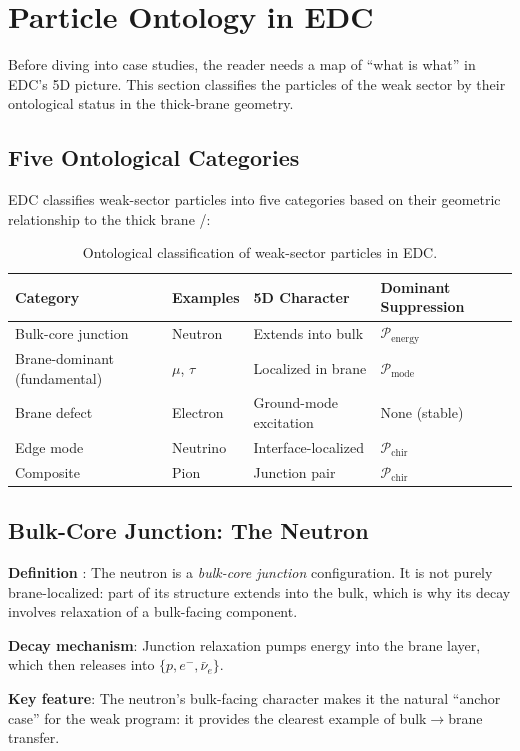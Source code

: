 
\section{Particle Ontology in EDC}
\label{sec:ontology}

Before diving into case studies, the reader needs a map of ``what is what'' in
EDC's 5D picture. This section classifies the particles of the weak sector by
their ontological status in the thick-brane geometry.

\subsection{Five Ontological Categories}

EDC classifies weak-sector particles into five categories based on their
geometric relationship to the thick brane \tagP{}/\tagDc{}:

\begin{table}[ht]
\centering
\begin{tabular}{llll}
\toprule
\textbf{Category} & \textbf{Examples} & \textbf{5D Character} & \textbf{Dominant Suppression} \\
\midrule
Bulk-core junction & Neutron & Extends into bulk & $\mathcal{P}_{\text{energy}}$ \\
Brane-dominant (fundamental) & $\mu$, $\tau$ & Localized in brane & $\mathcal{P}_{\text{mode}}$ \\
Brane defect & Electron & Ground-mode excitation & None (stable) \\
Edge mode & Neutrino & Interface-localized & $\mathcal{P}_{\text{chir}}$ \\
Composite & Pion & Junction pair & $\mathcal{P}_{\text{chir}}$ \\
\bottomrule
\end{tabular}
\caption{Ontological classification of weak-sector particles in EDC.}
\label{tab:ontology}
\end{table}

\subsection{Bulk-Core Junction: The Neutron}

\begin{tcolorbox}[mechanism, title={Neutron Ontology}]
\textbf{Definition} \tagP{}: The neutron is a \emph{bulk-core junction} configuration.
It is not purely brane-localized: part of its structure extends into the bulk, which
is why its decay involves relaxation of a bulk-facing component.

\textbf{Decay mechanism}: Junction relaxation pumps energy into the brane layer,
which then releases into $\{p, e^-, \bar\nu_e\}$.

\textbf{Key feature}: The neutron's bulk-facing character makes it the natural
``anchor case'' for the weak program: it provides the clearest example of
bulk$\to$brane transfer.
\end{tcolorbox}

